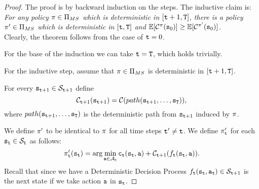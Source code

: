 \begin{proof}
The proof is by backward induction on the steps. The inductive claim is:\\
{\em For any policy $\pi\in \Pi_{MS}$ which is deterministic in
$[{\tt t}+1,{\tt T}]$, there is a policy $\pi'\in \Pi_{MS}$
which is deterministic in $[{\tt t},{\tt T}]$ and
$\mathbb{E}[\mathcal{C}^\pi({\tt s}_0)]\geq
\mathbb{E}[\mathcal{C}^{\pi'}({\tt s}_0)]$.}\\
Clearly, the theorem follows from the case of ${\tt t}=0$.

For the base of the induction we can take ${\tt t}={\tt T}$, which
holds trivially.

For the inductive step, assume that $\pi\in \Pi_{MS}$ is
deterministic in $[{\tt t}+1,{\tt T}]$.


For every ${\tt s}_{{\tt t}+1}\in \mathcal{S}_{{\tt t}+1}$ define
\[
\mathcal{C}_{{\tt t}+1}({\tt s}_{{\tt t}+1})=\mathcal{C}(path({\tt s}_{{\tt t}+1},
\dots , {\tt s}_{\tt T})),
\]
where $path({\tt s}_{{\tt t}+1}, \dots , {\tt s}_{\tt T})$ is the
deterministic path from ${\tt s}_{{\tt t}+1}$ induced by $\pi$.

We define $\pi'$ to be identical to $\pi$ for all time steps
${\tt t}'\neq {\tt t}$. We define $\pi'_{\tt t}$ for each
${\tt s}_{\tt t}\in \mathcal{S}_{\tt t}$ as follows:
\begin{equation}
\label{eq:sec2-MS-MD}
\pi'_{\tt t}({\tt s}_{\tt t})=\arg\min_{{\tt a}\in
\mathcal{A}_{\tt t}} {\tt c}_{{\tt t}}({\tt s}_{\tt t},{\tt a})+
\mathcal{C}_{{\tt t}+1}(f_{\tt t}({\tt s}_{\tt t},{\tt a})).
\end{equation}
Recall that since we have a Deterministic Decision Process
$f_{\tt t}({\tt s}_{\tt t},{\tt a}_{\tt t})\in \mathcal{S}_{{\tt t}+1}$ is
the next state if we take action ${\tt a}$ in ${\tt s}_{\tt t}$.


\end{proof}
